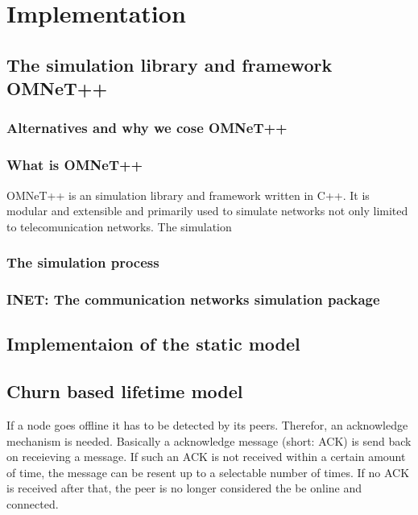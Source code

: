 \chapter{Implementation}

\section{The simulation library and framework OMNeT++}

\subsection{Alternatives and why we cose OMNeT++}

\subsection{What is OMNeT++}

OMNeT++ is an simulation library and framework written in C++. It is modular and extensible and primarily used to simulate networks not only limited to telecomunication networks. The simulation 

\subsection{The simulation process}

\subsection{INET: The communication networks simulation package}

\section{Implementaion of the static model}



\section{Churn based lifetime model}
If a node goes offline it has to be detected by its peers. Therefor, an acknowledge mechanism is needed. Basically a acknowledge message (short: ACK) is send back on receieving a message. If such an ACK is not received within a certain amount of time, the message can be resent up to a selectable number of times. If no ACK is received after that, the peer is no longer considered the be online and connected.




